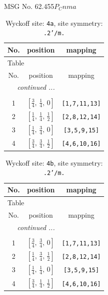 \documentclass[fleqn,8pt]{jsarticle}
\begin{document}
\setcounter{MaxMatrixCols}{32}

\renewcommand{\tablename}{Table~}
\renewcommand{\figurename}{Figure~}
\begin{center}
\LARGE
MSG No. 62.455\quad$P_{C}nma$
\end{center}
\renewcommand{\arraystretch}{1.2}
\begin{longtable}{ccc}
\caption{Wyckoff site: {\tt 4a}, site symmetry: {\tt .2'/m.}}
 \\
 \hline \hline
No. & position & mapping \\ \hline \endfirsthead

\multicolumn{2}{l}{\tablename\ \thetable{}} \\
 \hline \hline
No. & position & mapping \\ \hline \endhead

 \hline \hline
\multicolumn{2}{r}{\footnotesize\it continued ...} \\ \endfoot

 \hline \hline
\multicolumn{2}{r}{} \\ \endlastfoot

1 & $\left[ \frac{3}{4},\, \frac{1}{4},\, 0 \right]$ & {\tt [1,7,11,13]} \\ \hline
2 & $\left[ \frac{1}{4},\, \frac{1}{4},\, \frac{1}{2} \right]$ & {\tt [2,8,12,14]} \\ \hline
3 & $\left[ \frac{1}{4},\, \frac{3}{4},\, 0 \right]$ & {\tt [3,5,9,15]} \\ \hline
4 & $\left[ \frac{3}{4},\, \frac{3}{4},\, \frac{1}{2} \right]$ & {\tt [4,6,10,16]} \\
\end{longtable}
\renewcommand{\arraystretch}{1.2}
\begin{longtable}{ccc}
\caption{Wyckoff site: {\tt 4b}, site symmetry: {\tt .2'/m.}}
 \\
 \hline \hline
No. & position & mapping \\ \hline \endfirsthead

\multicolumn{2}{l}{\tablename\ \thetable{}} \\
 \hline \hline
No. & position & mapping \\ \hline \endhead

 \hline \hline
\multicolumn{2}{r}{\footnotesize\it continued ...} \\ \endfoot

 \hline \hline
\multicolumn{2}{r}{} \\ \endlastfoot

1 & $\left[ \frac{3}{4},\, \frac{3}{4},\, 0 \right]$ & {\tt [1,7,11,13]} \\ \hline
2 & $\left[ \frac{1}{4},\, \frac{3}{4},\, \frac{1}{2} \right]$ & {\tt [2,8,12,14]} \\ \hline
3 & $\left[ \frac{1}{4},\, \frac{1}{4},\, 0 \right]$ & {\tt [3,5,9,15]} \\ \hline
4 & $\left[ \frac{3}{4},\, \frac{1}{4},\, \frac{1}{2} \right]$ & {\tt [4,6,10,16]} \\
\end{longtable}
\end{document}
